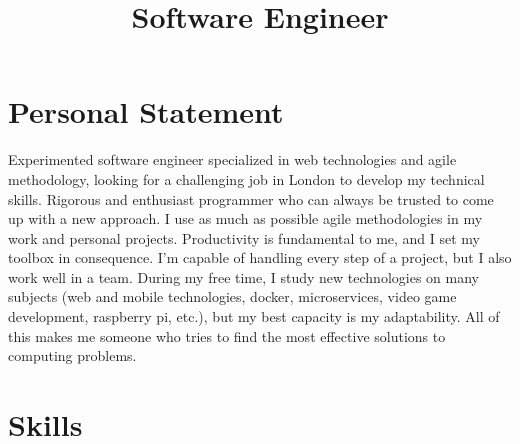 \documentclass[11pt,a4paper]{moderncv}
\title{Software Engineer}
\begin{document}
\makecvtitle
\vspace*{-7mm}

\section{Personal Statement}
    Experimented software engineer specialized in web technologies and agile methodology, looking for a challenging job in London to develop my technical skills. 
\medskip \newline
    Rigorous and enthusiast programmer who can always be trusted to come up with a new approach. 
    I use as much as possible agile methodologies in my work and personal projects. 
    Productivity is fundamental to me, and I set my toolbox in consequence. 
    I'm capable of handling every step of a project, but I also work well in a team. 
\medskip \newline
    During my free time, I study new technologies on many subjects (web and mobile technologies, docker, microservices, video game development, raspberry pi, etc.), but my best capacity is my adaptability. 
    All of this makes me someone who tries to find the most effective solutions to computing problems.

\section{Skills}
\end{document}
